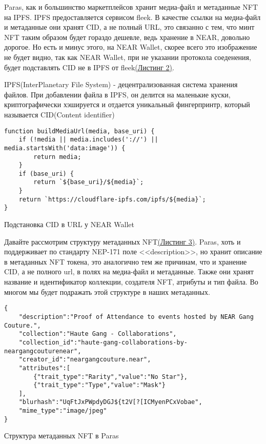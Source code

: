 Paras, как и большинство маркетплейсов хранит медиа-файл и метаданные NFT на IPFS\cite{ipfs}. IPFS предоставляется сервисом fleek\cite{fleek}. В качестве ссылки на медиа-файл и метаданные они хранят CID, а не полный URL, это связанно с тем, что минт NFT таким образом будет гораздо дешевле, ведь хранение в NEAR, довольно дорогое\cite{nearstoragestackinghowmuch}. Но есть и минус этого, на NEAR Wallet, скорее всего это изображение не будет видно, так как NEAR Wallet, при не указании протокола соеденения, будет подставлять CID не в IPFS от fleek\hyperref[lst.pastecidnearwallet]{(Листинг 2)}.

\begin{definition}
    IPFS(InterPlanetary File System) - децентрализованная система хранения файлов. При добавлении файла в IPFS, он делится на маленькие куски, криптографически хэшируется и отдается уникальный фингерпринтр, который называется CID(Content identifier) \cite{ipfs}
\end{definition}

\begin{listing}[H]
\begin{verbatim}
function buildMediaUrl(media, base_uri) {
    if (!media || media.includes('://') || media.startsWith('data:image')) {
        return media;
    }
    if (base_uri) {
        return `${base_uri}/${media}`;
    }
    return `https://cloudflare-ipfs.com/ipfs/${media}`;
}
\end{verbatim}
\caption{Подстановка CID в URL у NEAR Wallet\cite{pastecidnearwallet}}
\label{lst.pastecidnearwallet}
\end{listing}

Давайте рассмотрим структуру метаданных NFT\hyperref[lst.parasnftmetadatastruct]{(Листинг 3)}. Paras, хоть и поддерживает по стандарту NEP-171 поле <<description>>, но хранит описание в метаданных NFT токена, это аналогично тем же причинам, что и хранение CID, а не полного url, в полях на медиа-файл и метаданные. Также они хранят название и идентификатор коллекции, создателя NFT, атрибуты и тип файла. Во многом мы будет подражать этой структуре в наших метаданных.

\begin{listing}[H]
\begin{verbatim}
{
    "description":"Proof of Attendance to events hosted by NEAR Gang Couture.",
    "collection":"Haute Gang - Collaborations",
    "collection_id":"haute-gang-collaborations-by-neargangcouturenear",
    "creator_id":"neargangcouture.near",
    "attributes":[
        {"trait_type":"Rarity","value":"No Star"},
        {"trait_type":"Type","value":"Mask"}
    ],
    "blurhash":"UqFtJxPWpdyDGJ${t2V[?[ICMyenPCxVobae",
    "mime_type":"image/jpeg"
}
\end{verbatim}
\caption{Структура метаданных NFT в Paras}
\label{lst.parasnftmetadatastruct}
\end{listing}


